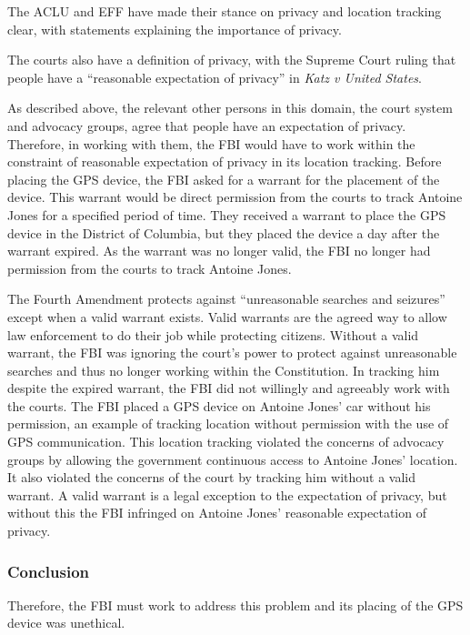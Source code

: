 \documentclass[12pt]{article}
\newcounter{subsubsubsection}[subsubsection]
\begin{document}
\begin{multicols}{2}
The ACLU and EFF have made their stance on privacy and location tracking clear, with statements explaining the importance of privacy. \cite{aclu_privacy, eff_privacy}

The courts also have a definition of privacy, with the Supreme Court ruling that people have a ``reasonable expectation of privacy'' in \textit{Katz v United States}. \cite{katz}

As described above, the relevant other persons in this domain, the court system and advocacy groups, agree that people have an expectation of privacy. Therefore, in working with them, the FBI would have to work within the constraint of reasonable expectation of privacy in its location tracking.
Before placing the GPS device, the FBI asked for a warrant for the placement of the device. \cite{usvjonesopinions} 
This warrant would be direct permission from the courts to track Antoine Jones for a specified period of time.
They received a warrant to place the GPS device in the District of Columbia, but they placed the device a day after the warrant expired. \cite{usvjonesopinions}
As the warrant was no longer valid, the FBI no longer had permission from the courts to track Antoine Jones.

The Fourth Amendment protects against ``unreasonable searches and seizures'' except when a valid warrant exists. \cite{constitution}
Valid warrants are the agreed way to allow law enforcement to do their job while protecting citizens.
Without a valid warrant, the FBI was ignoring the court's power to protect against unreasonable searches and thus no longer working within the Constitution.
In tracking him despite the expired warrant, the FBI did not willingly and agreeably work with the courts.
The FBI placed a GPS device on Antoine Jones' car without his permission\cite{usvjonesopinions}, an example of tracking location without permission with the use of GPS communication.
This location tracking violated the concerns of advocacy groups by allowing the government continuous access to Antoine Jones' location. \cite{aclu}
It also violated the concerns of the court by tracking him without a valid warrant. \cite{usvjonesopinions}
A valid warrant is a legal exception to the expectation of privacy, but without this the FBI infringed on Antoine Jones' reasonable expectation of privacy.
\subsubsection{Conclusion}
Therefore, the FBI must work to address this problem and its placing of the GPS device was unethical.


\end{multicols}
\end{document}
